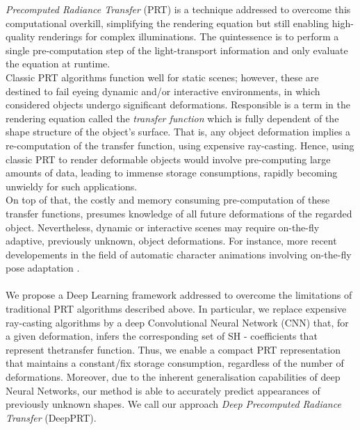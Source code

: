 \textit{Precomputed Radiance Transfer} (PRT) is a technique addressed to overcome this computational overkill, simplifying the rendering equation but still enabling high-quality renderings for complex illuminations. The quintessence is to perform a single pre-computation step of the light-transport information and only evaluate the equation at runtime.\\
Classic PRT algorithms function well for static scenes; however, these are destined to fail eyeing dynamic and/or interactive environments, in which considered objects undergo significant deformations.
Responsible is a term in the rendering equation called the \textit{transfer function} which is fully dependent of the shape structure of the object's surface. That is, any object deformation implies a re-computation of the transfer function,  using expensive ray-casting. Hence, using classic PRT to render deformable objects would involve pre-computing large amounts of data, leading to immense storage consumptions, rapidly becoming unwieldy for such applications.  \\
On top of that, the costly and memory consuming pre-computation of these transfer functions, presumes knowledge of all future deformations of the regarded object. Nevertheless, dynamic or interactive scenes may require on-the-fly adaptive, previously unknown, object deformations. For instance, more recent developements in the field of automatic character animations involving on-the-fly pose adaptation \cite{DeepHuman,Holden2017, QuadrupedMotion}. 
\\
\\
We propose a Deep Learning framework addressed to overcome the limitations of traditional PRT algorithms described above. In particular, we replace expensive ray-casting algorithms by a deep Convolutional Neural Network (CNN) that, for a given deformation, infers the corresponding set of SH - coefficients that represent thetransfer function. 
Thus, we enable a compact PRT representation that maintains a constant/fix storage consumption, regardless of the number of deformations. Moreover, due to the inherent generalisation capabilities of deep Neural Networks, our method is able to accurately predict appearances of previously unknown shapes. We call our approach \textit{Deep Precomputed Radiance Transfer} (DeepPRT). \\
